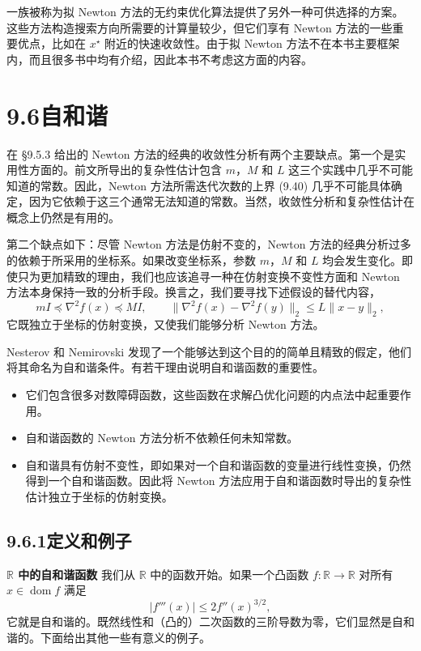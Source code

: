 \documentclass[UTF8,12pt,a4paper,fontset=fandol]{ctexart}
\begin{document}
一族被称为拟 Newton 方法的无约束优化算法提供了另外一种可供选择的方案。这些方法构造搜索方向所需要的计算量较少，但它们享有 Newton 方法的一些重要优点，比如在 $x^\star$ 附近的快速收敛性。由于拟 Newton 方法不在本书主要框架内，而且很多书中均有介绍，因此本书不考虑这方面的内容。

\section*{9.6\quad 自和谐}

在 \S9.5.3 给出的 Newton 方法的经典的收敛性分析有两个主要缺点。第一个是实用性方面的。前文所导出的复杂性估计包含 $m$，$M$ 和 $L$ 这三个实践中几乎不可能知道的常数。因此，Newton 方法所需迭代次数的上界 (9.40) 几乎不可能具体确定，因为它依赖于这三个通常无法知道的常数。当然，收敛性分析和复杂性估计在概念上仍然是有用的。

第二个缺点如下：尽管 Newton 方法是仿射不变的，Newton 方法的经典分析过多的依赖于所采用的坐标系。如果改变坐标系，参数 $m$，$M$ 和 $L$ 均会发生变化。即使只为更加精致的理由，我们也应该追寻一种在仿射变换不变性方面和 Newton 方法本身保持一致的分析手段。换言之，我们要寻找下述假设的替代内容，
\[
mI\preceq\nabla^2f(x)\preceq MI,\qquad
\|\nabla^2f(x)-\nabla^2f(y)\|_2\leq L\|x-y\|_2,
\]
它既独立于坐标的仿射变换，又使我们能够分析 Newton 方法。

Nesterov 和 Nemirovski 发现了一个能够达到这个目的的简单且精致的假定，他们将其命名为自和谐条件。有若干理由说明自和谐函数的重要性。
\begin{itemize}
\item 它们包含很多对数障碍函数，这些函数在求解凸优化问题的内点法中起重要作用。
\item 自和谐函数的 Newton 方法分析不依赖任何未知常数。
\item 自和谐具有仿射不变性，即如果对一个自和谐函数的变量进行线性变换，仍然得到一个自和谐函数。因此将 Newton 方法应用于自和谐函数时导出的复杂性估计独立于坐标的仿射变换。
\end{itemize}

\subsection*{9.6.1\quad 定义和例子}

\noindent\textbf{$\mathbb{R}$ 中的自和谐函数}\quad
我们从 $\mathbb{R}$ 中的函数开始。如果一个凸函数 $f:\mathbb{R}\to\mathbb{R}$ 对所有 $x\in\operatorname{dom} f$ 满足
\begin{equation}
|f'''(x)|\leq2f''(x)^{3/2},
\tag{9.41}
\end{equation}
它就是自和谐的。既然线性和（凸的）二次函数的三阶导数为零，它们显然是自和谐的。下面给出其他一些有意义的例子。
\end{document}
